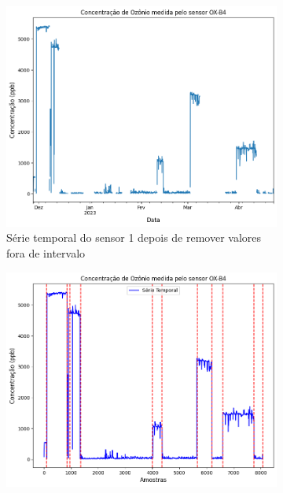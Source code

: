 \begin{figure}[h]
    \centering
    \caption{Série temporal dos sensores de \acrshort{o3} modelo OX-B431}
    \begin{subfigure}{0.495\textwidth}
        \includegraphics[width=\textwidth]{chapters/3-RESULTADOS CAMPO/Figuras/raw-o3-b4-1.png}
        \caption{Série temporal do sensor 1 depois de remover valores fora de intervalo}
        \label{fig:data-o3-1-raw}
    \end{subfigure}
    \hfill
    \begin{subfigure}{0.495\textwidth}
        \includegraphics[width=\textwidth]{chapters/3-RESULTADOS CAMPO/Figuras/rebase-o3-b4-1.png}

\end{subfigure}
\end{figure}
